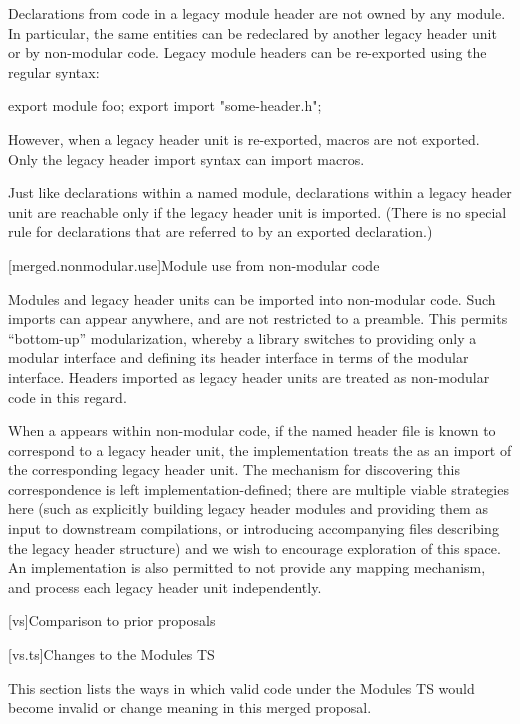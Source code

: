 \pnum
Declarations from code in a legacy module header
are not owned by any module.
In particular, the same entities can be redeclared
by another legacy header unit or by non-modular code.
Legacy module headers can be re-exported
using the regular  syntax:

\begin{codeblock}
export module foo;
export import "some-header.h";
\end{codeblock}

However, when a legacy header unit is re-exported,
macros are not exported.
Only the legacy header import syntax can import macros.

\pnum
Just like declarations within a named module,
declarations within a legacy header unit
are reachable only if the legacy header unit is imported.
(There is no special rule for declarations
that are referred to by an exported declaration.)

[merged.nonmodular.use]{Module use from non-modular code}

\pnum
Modules and legacy header units can be imported into non-modular code.
Such imports can appear anywhere, and are not restricted to a preamble.
This permits ``bottom-up'' modularization,
whereby a library switches to providing only a modular interface
and defining its header interface in terms of the modular interface.
Headers imported as legacy header units are treated as non-modular code
in this regard.

\pnum
When a  appears within non-modular code,
if the named header file is known to correspond to a legacy header unit,
the implementation treats the  as an import
of the corresponding legacy header unit.
The mechanism for discovering this correspondence
is left implementation-defined;
there are multiple viable strategies here
(such as explicitly building legacy header modules and
providing them as input to downstream compilations, or
introducing accompanying files describing the legacy header structure)
and we wish to encourage exploration of this space.
An implementation is also permitted to not provide any mapping mechanism,
and process each legacy header unit independently.

[vs]{Comparison to prior proposals}

[vs.ts]{Changes to the Modules TS}

\pnum
This section lists the ways in which valid code under the Modules TS
would become invalid or change meaning in this merged proposal.

